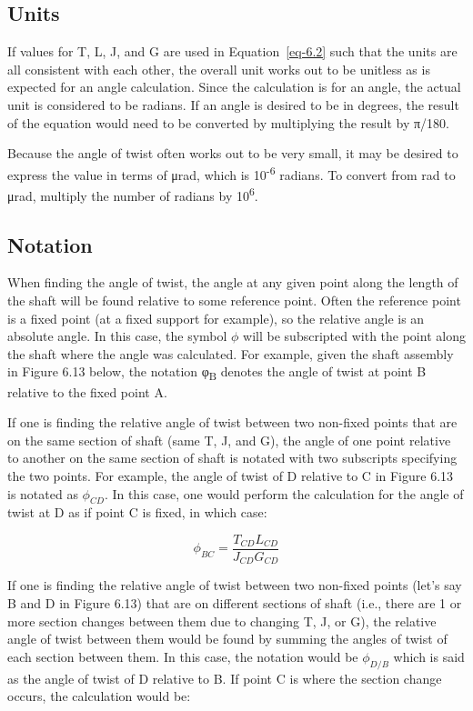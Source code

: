\documentclass[
  letterpaper,
  DIV=11,
  numbers=noendperiod]{scrreprt}
\theoremstyle{definition}
\theoremstyle{remark}
\begin{document}
\subsection{Units}\label{units}

If values for T, L, J, and G are used in Equation~\ref{eq-6.2} such that
the units are all consistent with each other, the overall unit works out
to be unitless as is expected for an angle calculation. Since the
calculation is for an angle, the actual unit is considered to be
radians. If an angle is desired to be in degrees, the result of the
equation would need to be converted by multiplying the result by π/180.

Because the angle of twist often works out to be very small, it may be
desired to express the value in terms of μrad, which is
10\textsuperscript{-6} radians. To convert from rad to μrad, multiply
the number of radians by 10\textsuperscript{6}.

\subsection{Notation}\label{notation}

When finding the angle of twist, the angle at any given point along the
length of the shaft will be found relative to some reference point.
Often the reference point is a fixed point (at a fixed support for
example), so the relative angle is an absolute angle. In this case, the
symbol \(\phi\) will be subscripted with the point along the shaft where
the angle was calculated. For example, given the shaft assembly in
Figure 6.13 below, the notation φ\textsubscript{B} denotes the angle of
twist at point B relative to the fixed point A.

If one is finding the relative angle of twist between two non-fixed
points that are on the same section of shaft (same T, J, and G), the
angle of one point relative to another on the same section of shaft is
notated with two subscripts specifying the two points. For example, the
angle of twist of D relative to C in Figure 6.13 is notated as
\(\phi_{CD}\). In this case, one would perform the calculation for the
angle of twist at D as if point C is fixed, in which case:

\[
\phi_{B C}=\frac{T_{C D} L_{C D}}{J_{C D} G_{C D}}
\]

If one is finding the relative angle of twist between two non-fixed
points (let's say B and D in Figure 6.13) that are on different sections
of shaft (i.e., there are 1 or more section changes between them due to
changing T, J, or G), the relative angle of twist between them would be
found by summing the angles of twist of each section between them. In
this case, the notation would be \(\phi_{D/B}\) which is said as the
angle of twist of D relative to B. If point C is where the section
change occurs, the calculation would be:
\end{document}
